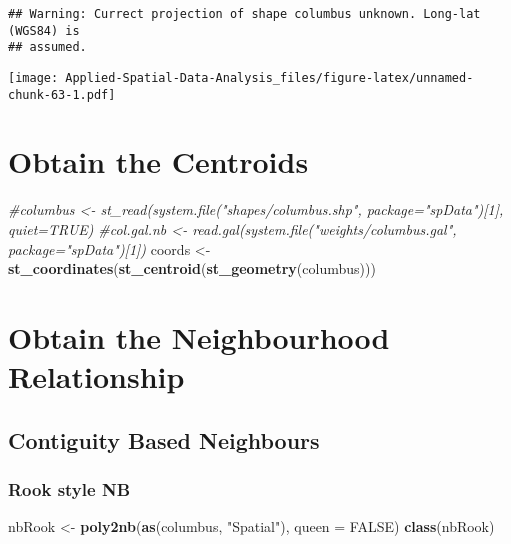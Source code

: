 \documentclass[
]{book}
\newenvironment{Shaded}{\begin{snugshade}}{\end{snugshade}}
\newcommand{\CommentTok}[1]{\textcolor[rgb]{0.56,0.35,0.01}{\textit{#1}}}
\newcommand{\DataTypeTok}[1]{\textcolor[rgb]{0.13,0.29,0.53}{#1}}
\newcommand{\KeywordTok}[1]{\textcolor[rgb]{0.13,0.29,0.53}{\textbf{#1}}}
\newcommand{\NormalTok}[1]{#1}
\newcommand{\OtherTok}[1]{\textcolor[rgb]{0.56,0.35,0.01}{#1}}
\newcommand{\StringTok}[1]{\textcolor[rgb]{0.31,0.60,0.02}{#1}}
\begin{document}
\begin{verbatim}
## Warning: Currect projection of shape columbus unknown. Long-lat (WGS84) is
## assumed.
\end{verbatim}

\texttt{[image: Applied-Spatial-Data-Analysis\_files/figure-latex/unnamed-chunk-63-1.pdf]}

\hypertarget{obtain-the-centroids}{%
\section{Obtain the Centroids}\label{obtain-the-centroids}}

\begin{Shaded}
\begin{Highlighting}[]
\CommentTok{#columbus <- st_read(system.file("shapes/columbus.shp", package="spData")[1], quiet=TRUE)}
\CommentTok{#col.gal.nb <- read.gal(system.file("weights/columbus.gal", package="spData")[1])}
\NormalTok{coords <-}\StringTok{ }\KeywordTok{st_coordinates}\NormalTok{(}\KeywordTok{st_centroid}\NormalTok{(}\KeywordTok{st_geometry}\NormalTok{(columbus)))}
\end{Highlighting}
\end{Shaded}

\hypertarget{obtain-the-neighbourhood-relationship}{%
\section{Obtain the Neighbourhood Relationship}\label{obtain-the-neighbourhood-relationship}}

\hypertarget{contiguity-based-neighbours}{%
\subsection{Contiguity Based Neighbours}\label{contiguity-based-neighbours}}

\hypertarget{rook-style-nb}{%
\subsubsection{Rook style NB}\label{rook-style-nb}}

\begin{Shaded}
\begin{Highlighting}[]
\NormalTok{nbRook <-}\StringTok{ }\KeywordTok{poly2nb}\NormalTok{(}\KeywordTok{as}\NormalTok{(columbus, }\StringTok{"Spatial"}\NormalTok{), }\DataTypeTok{queen =} \OtherTok{FALSE}\NormalTok{)}
\KeywordTok{class}\NormalTok{(nbRook)}
\end{Highlighting}
\end{Shaded}
\end{document}
